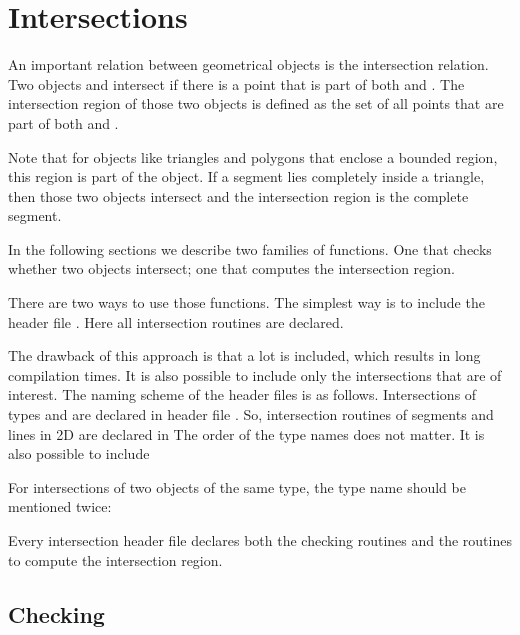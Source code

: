 
\cleardoublepage
\chapter{Intersections}

An important relation between geometrical objects is the intersection
relation.
Two objects  and  intersect if there is a point
 that is part of both  and .
The intersection region of those two objects is defined as the set of all
points  that are part of both  and .

Note that for objects like triangles and polygons that enclose a
bounded region, this region is part of the object.
If a segment lies completely inside a triangle, then those two objects
intersect and the intersection region is the complete segment.

In the following sections we describe two families of functions.
One that checks whether two objects intersect; one that computes the
intersection region.

There are two ways to use those functions.
The simplest way is to include the header file
. Here all intersection routines are declared.

The drawback of this approach is that a lot is included, which results
in long compilation times.
It is also possible to include only the intersections that are of interest.
The naming scheme of the header files is as follows.
Intersections of types  and 
are declared in header file
.
So, intersection routines of segments and lines in 2D are declared in
The order of the type names does not matter.
It is also possible to include

For intersections of two objects of the same type, the type name should be
mentioned twice:\\

Every intersection header file declares both the checking routines and the
routines to compute the intersection region.


\section{Checking}

